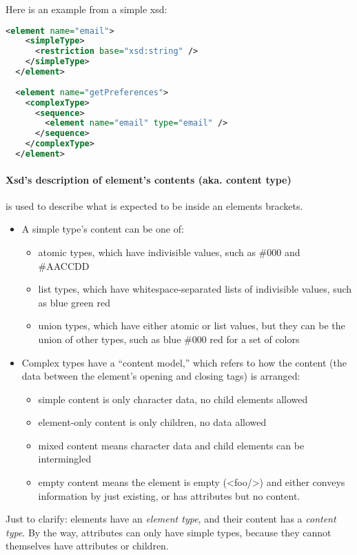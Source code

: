 Here is an example from a simple xsd: 
\begin{lstlisting}[language=XML]
<element name="email">
    <simpleType>
      <restriction base="xsd:string" />
    </simpleType>
  </element>
  
  <element name="getPreferences">
    <complexType>
      <sequence>
        <element name="email" type="email" />
      </sequence>
    </complexType>
  </element>
\end{lstlisting}

\paragraph{Xsd's description of element's contents (aka. content type)} is used to describe what is expected to be inside an elements brackets. 
\begin{itemize}
    \item A simple type’s content can be one of:
        \begin{itemize}
            \item atomic types, which have indivisible values, such as \#000 and \#AACCDD
            \item list types, which have whitespace-separated lists of indivisible values, such as blue green red
            \item union types, which have either atomic or list values, but they can be the union of other types, such as blue \#000 red for a set of colors
        \end{itemize}
    \item Complex types have a “content model,” which refers to how the content (the data between the element’s opening and closing tags) is arranged:
        \begin{itemize}
            \item simple content is only character data, no child elements allowed
            \item element-only content is only children, no data allowed
            \item mixed content means character data and child elements can be intermingled
            \item empty content means the element is empty (<foo/>) and either conveys information by just existing, or has attributes but no content.
        \end{itemize}
\end{itemize}

Just to clarify: elements have an \emph{element type}, and their content has a \emph{content type}. By the way, attributes can only have simple types, because they cannot themselves have attributes or children.

